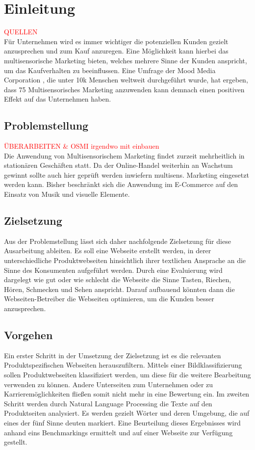 \section{Einleitung}  \textcolor{red}{QUELLEN} \\
Für Unternehmen wird es immer wichtiger die potenziellen Kunden gezielt anzusprechen und zum Kauf anzuregen. Eine Möglichkeit kann hierbei das multisensorische Marketing bieten, welches mehrere Sinne der Kunden anspricht, um das Kaufverhalten zu beeinflussen. Eine Umfrage der Mood Media Corporation , die unter 10k Menschen weltweit durchgeführt wurde, hat ergeben, dass 75%
Multisensorisches Marketing anzuwenden kann demnach einen positiven Effekt auf das Unternehmen haben.

\subsection{Problemstellung}
\textcolor{red}{ÜBERARBEITEN & OSMI irgendwo mit einbauen} \\
Die Anwendung von Multisensorischem Marketing findet zurzeit mehrheitlich in stationären Geschäften statt. Da der Online-Handel weiterhin an Wachstum gewinnt   sollte auch hier geprüft werden inwiefern multisens. Marketing eingesetzt werden kann.
Bisher beschränkt sich die Anwendung im E-Commerce auf den Einsatz von Musik und visuelle Elemente.

\subsection{Zielsetzung}
Aus der Problemstellung lässt sich daher nachfolgende Zielsetzung für diese Ausarbeitung ableiten. Es soll eine Webseite erstellt werden, in derer unterschiedliche Produktwebseiten hinsichtlich ihrer textlichen Ansprache an die Sinne des Konsumenten aufgeführt werden. Durch eine Evaluierung wird dargelegt wie gut oder wie schlecht die Webseite die Sinne Tasten, Riechen, Hören, Schmecken und Sehen anspricht.
Darauf aufbauend könnten dann die Webseiten-Betreiber die Webseiten optimieren, um die Kunden besser anzusprechen.

\subsection{Vorgehen}
Ein erster Schritt in der Umsetzung der Zielsetzung ist es die relevanten Produktspezifischen Webseiten herauszufiltern. Mittels einer Bildklassifizierung sollen Produktwebseiten klassifiziert werden, um diese für die weitere Bearbeitung verwenden zu können. Andere Unterseiten zum Unternehmen oder zu Karrieremöglichkeiten fließen somit nicht mehr in eine Bewertung ein. Im zweiten Schritt werden durch Natural Language Processing die Texte auf den Produktseiten analysiert. Es werden gezielt Wörter und deren Umgebung, die auf eines der fünf Sinne deuten markiert.
Eine Beurteilung dieses Ergebnisses wird anhand eins Benchmarkings ermittelt und auf einer Webseite zur Verfügung gestellt.

